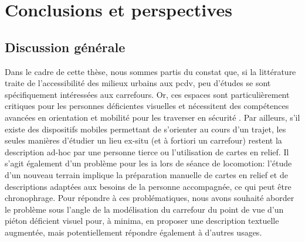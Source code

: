 \chapter{Conclusions et perspectives}
\label{chap:conclusion}



\section{Discussion générale}

Dans le cadre de cette thèse, nous sommes partis du constat que, si la littérature traite de l'accessibilité des milieux urbains aux \gls{pcdv}, peu d'études se sont spécifiquement intéressées aux carrefours. Or, ces espaces sont particulièrement critiques pour les personnes déficientes visuelles et nécessitent des compétences avancées en orientation et mobilité pour les traverser en sécurité \cite{ratelle_manuel_2019}. Par ailleurs, s'il existe des dispositifs mobiles permettant de s'orienter au cours d'un trajet, les seules manières d'étudier un lieu ex-situ (et à fortiori un carrefour) restent la description ad-hoc par une personne tierce ou l'utilisation de cartes en relief. Il s'agit également d'un problème pour les \gls{ia} lors de séance de locomotion: l'étude d'un nouveau terrain implique la préparation manuelle de cartes en relief et de descriptions adaptées aux besoins de la personne accompagnée, ce qui peut être chronophrage. Pour répondre à ces problématiques, nous avons souhaité aborder le problème sous l'angle de la modélisation du carrefour du point de vue d'un piéton déficient visuel pour, à minima, en proposer une description textuelle augmentée, mais potentiellement répondre également à d'autres usages.

